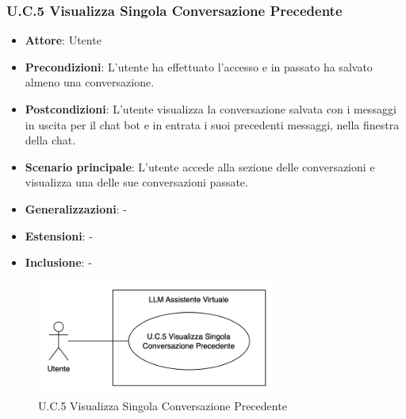 \subsubsection{U.C.5 Visualizza Singola Conversazione Precedente}
\begin{itemize}
    \item \textbf{Attore}: Utente
    \item \textbf{Precondizioni}: L'utente ha effettuato l'accesso e in passato ha salvato almeno una conversazione.
    \item \textbf{Postcondizioni}: L'utente visualizza la conversazione salvata con i messaggi in uscita per il chat bot e in entrata i suoi precedenti messaggi, nella finestra della chat.
    \item \textbf{Scenario principale}: L'utente accede alla sezione delle conversazioni e visualizza una delle sue conversazioni passate.
    \item \textbf{Generalizzazioni}: -
    \item \textbf{Estensioni}: -
    \item \textbf{Inclusione}: -
\end{itemize}
\begin{figure}[H]
    \centering
    \includegraphics[width=0.7\textwidth]{img/UC5.png}
    \caption{U.C.5 Visualizza Singola Conversazione Precedente}
\end{figure}
\newpage

